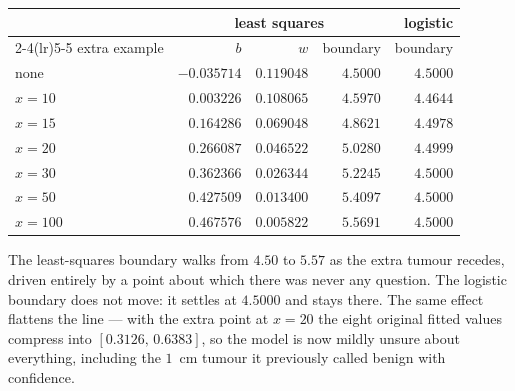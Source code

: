 \begin{center}
\small
\renewcommand{\arraystretch}{1.2}
\begin{tabular}{@{}lrrrr@{}}
\toprule
 & \multicolumn{3}{c}{least squares} & logistic\\
\cmidrule(lr){2-4}\cmidrule(lr){5-5}
extra example & $b$ & $w$ & boundary & boundary\\
\midrule
none      & $-0.035714$ & $0.119048$ & $4.5000$ & $4.5000$\\
$x = 10$  & $ 0.003226$ & $0.108065$ & $4.5970$ & $4.4644$\\
$x = 15$  & $ 0.164286$ & $0.069048$ & $4.8621$ & $4.4978$\\
$x = 20$  & $ 0.266087$ & $0.046522$ & $5.0280$ & $4.4999$\\
$x = 30$  & $ 0.362366$ & $0.026344$ & $5.2245$ & $4.5000$\\
$x = 50$  & $ 0.427509$ & $0.013400$ & $5.4097$ & $4.5000$\\
$x = 100$ & $ 0.467576$ & $0.005822$ & $5.5691$ & $4.5000$\\
\bottomrule
\end{tabular}
\end{center}

The least-squares boundary walks from $4.50$ to $5.57$ as the extra tumour
recedes, driven entirely by a point about which there was never any question.
The logistic boundary does not move: it settles at $4.5000$ and stays there. The
same effect flattens the line --- with the extra point at $x = 20$ the eight
original fitted values compress into $[0.3126,\,0.6383]$, so the model is now
mildly unsure about everything, including the $1$~cm tumour it previously called
benign with confidence.

